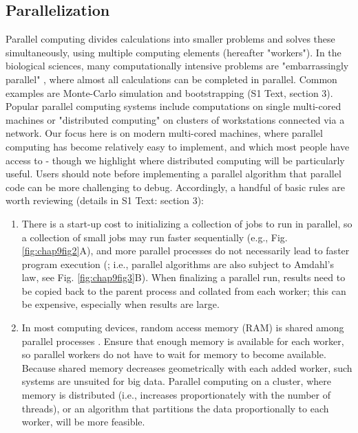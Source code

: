 \documentclass[b5paper,justified]{tufte-book} %
\begin{document}
\begin{fullwidth}
\subsection{Parallelization}
Parallel computing divides calculations into smaller problems and solves these simultaneously, using multiple computing elements (hereafter "workers"). In the biological sciences, many computationally intensive problems are "embarrassingly parallel" \citep{Grama2003}, where almost all calculations can be completed in parallel. Common examples are Monte-Carlo simulation and bootstrapping (S1 Text, section 3). Popular parallel computing systems include computations on single multi-cored machines or "distributed computing" on clusters of workstations connected
via a network. Our focus here is on modern multi-cored machines, where parallel computing has become relatively easy to implement, and which most people have access to - though we highlight where distributed computing will be particularly useful. Users should note before implementing a parallel algorithm that parallel code can be more challenging to debug. Accordingly, a handful of basic rules are worth reviewing (details in S1 Text: section 3):

\begin{enumerate}

\item There is a start-up cost to initializing a collection of jobs to run in parallel, so a collection
of small jobs may run faster sequentially (e.g., Fig. \ref{fig:chap9fig2}A), and more parallel processes do
not necessarily lead to faster program execution (\citealt{Hager2010}; i.e., parallel algorithms are also subject to Amdahl's law, see Fig. \ref{fig:chap9fig3}B). When finalizing a parallel run, results need to be copied back to the parent process and collated from each worker; this can be expensive, especially when results are large.

\item In most computing devices, random access memory (RAM) is shared among parallel processes \citep{Schmidberger2009}. Ensure that enough memory is available for each worker, so parallel workers do not have to wait for memory to become available. Because shared memory decreases geometrically with each added worker, such systems are unsuited for big data. Parallel computing on a cluster, where memory is distributed (i.e., increases proportionately with the number of threads), or an algorithm that partitions the data proportionally to each worker, will be more feasible.


\end{enumerate}
\end{fullwidth}
\end{document}
